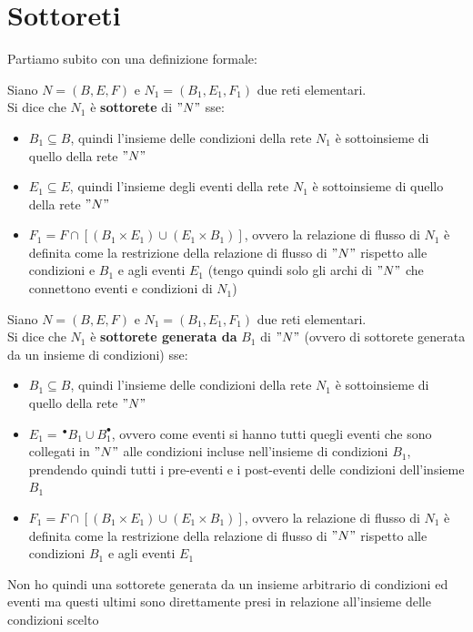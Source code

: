 \section{Sottoreti}
Partiamo subito con una definizione formale:
\begin{definizione}
  Siano $N=(B, E, F)$ e $N_1=(B_1, E_1, F_1)$ due reti elementari.\\
  Si dice che $N_1$ è \textbf{sottorete} di $"N"$ sse:
  \begin{itemize}
    \item $B_1\subseteq B$, quindi l'insieme delle condizioni della rete $N_1$
    è sottoinsieme di quello della rete $"N"$
    \item $E_1\subseteq E$, quindi l'insieme degli eventi della rete $N_1$
    è sottoinsieme di quello della rete $"N"$
    \item $F_1=F\cap[(B_1\times E_1)\cup (E_1\times B_1)]$, ovvero la relazione
    di flusso di $N_1$ è definita come la restrizione della relazione di flusso
    di $"N"$ rispetto alle condizioni e $B_1$ e agli eventi $E_1$ (tengo quindi
    solo gli archi di $"N"$ che connettono eventi e condizioni di $N_1$)
  \end{itemize}
\end{definizione} \vspace{5mm} %
\begin{definizione}
  Siano $N=(B, E, F)$ e $N_1=(B_1, E_1, F_1)$ due reti elementari.\\
  Si dice che $N_1$ è \textbf{sottorete generata da} $B_1$ di $"N"$ (ovvero di
  sottorete generata da un insieme di condizioni) sse:
  \begin{itemize}
    \item $B_1\subseteq B$, quindi l'insieme delle condizioni della rete $N_1$
    è sottoinsieme di quello della rete $"N"$
    \item $E_1=\, ^\bullet B_1\cup B_1^\bullet$, ovvero come eventi si
    hanno tutti quegli eventi che sono collegati in $"N"$ alle condizioni incluse
    nell'insieme di condizioni $B_1$, prendendo quindi tutti i pre-eventi e i
    post-eventi delle condizioni dell'insieme $B_1$
    \item $F_1=F\cap[(B_1\times E_1)\cup (E_1\times B_1)]$, ovvero la relazione
    di flusso di $N_1$ è definita come la restrizione della relazione di flusso
    di $"N"$ rispetto alle condizioni $B_1$ e agli eventi $E_1$
  \end{itemize}
  Non ho quindi una sottorete generata da un insieme arbitrario di condizioni ed
  eventi ma questi ultimi sono direttamente presi in relazione all'insieme delle
  condizioni scelto
\end{definizione} \vspace{5mm} %
